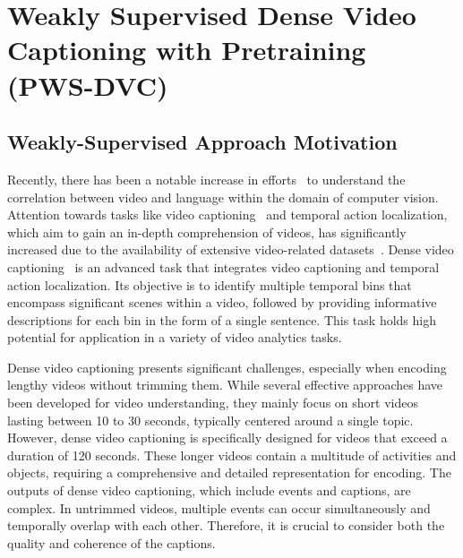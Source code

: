 
\chapter{Weakly Supervised Dense Video Captioning with Pretraining (PWS-DVC)}
\label{chap:pws_dvc}

\section{Weakly-Supervised Approach Motivation}

Recently, there has been a notable increase in efforts~\cite{Lei2021-mt,Sun2022-ij,Zellers2021-tm,Bain2021-si,Alayrac2022-ac,Akbari2021-ih} to understand the correlation between video and language within the domain of computer vision.
Attention towards tasks like video captioning~\cite{Gao2017-zs,Wang2018-yx,Rohrbach2013-md,Lin2022-wi,Seo2022-ok} and temporal action localization, which aim to gain an in-depth comprehension of videos, has significantly increased due to the availability of extensive video-related datasets~\cite{Karpathy2014-xm,Zellers2022-zr,Miech2019-hk,Zhou2018-eq,Huang2020-as}.
Dense video captioning~\cite{Krishna2017-pw} is an advanced task that integrates video captioning and temporal action localization.
Its objective is to identify multiple temporal bins that encompass significant scenes within a video, followed by providing informative descriptions for each bin in the form of a single sentence.
This task holds high potential for application in a variety of video analytics tasks.

Dense video captioning presents significant challenges, especially when encoding lengthy videos without trimming them. 
While several effective approaches have been developed for video understanding, they mainly focus on short videos lasting between 10 to 30 seconds, typically centered around a single topic.
However, dense video captioning is specifically designed for videos that exceed a duration of 120 seconds.
These longer videos contain a multitude of activities and objects, requiring a comprehensive and detailed representation for encoding.
The outputs of dense video captioning, which include events and captions, are complex. In untrimmed videos, multiple events can occur simultaneously and temporally overlap with each other.
Therefore, it is crucial to consider both the quality and coherence of the captions.

